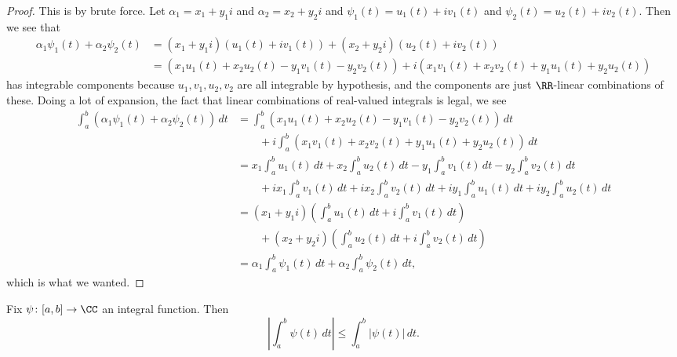 \begin{proof}
	This is by brute force. Let $\alpha_1=x_1+y_1i$ and $\alpha_2=x_2+y_2i$ and $\psi_1(t)=u_1(t)+iv_1(t)$ and $\psi_2(t)=u_2(t)+iv_2(t)$. Then we see that
	\begin{align*}
		\alpha_1\psi_1(t)+\alpha_2\psi_2(t) &= (x_1+y_1i)(u_1(t)+iv_1(t))+(x_2
		+y_2i)(u_2(t)+iv_2(t)) \\
		&= (x_1u_1(t)+x_2u_2(t)-y_1v_1(t)-y_2v_2(t))+i(x_1v_1(t)+x_2v_2(t)+y_1u_1(t)+y_2u_2(t))
	\end{align*}
	has integrable components because $u_1,v_1,u_2,v_2$ are all integrable by hypothesis, and the components are just $\RR$-linear combinations of these. Doing a lot of expansion, the fact that linear combinations of real-valued integrals is legal, we see
	\begin{align*}
		\int_a^b(\alpha_1\psi_1(t)+\alpha_2\psi_2(t))\,dt &= \int_a^b(x_1u_1(t)+x_2u_2(t)-y_1v_1(t)-y_2v_2(t))\,dt \\
		&\qquad+i\int_a^b(x_1v_1(t)+x_2v_2(t)+y_1u_1(t)+y_2u_2(t))\,dt \\
		&= x_1\int_a^bu_1(t)\,dt+x_2\int_a^bu_2(t)\,dt-y_1\int_a^bv_1(t)\,dt-y_2\int_a^bv_2(t)\,dt \\
		&\qquad+ix_1\int_a^bv_1(t)\,dt+ix_2\int_a^bv_2(t)\,dt+iy_1\int_a^bu_1(t)\,dt+iy_2\int_a^bu_2(t)\,dt \\
		&= (x_1+y_1i)\left(\int_a^bu_1(t)\,dt+i\int_a^bv_1(t)\,dt\right)\\
		&\qquad+(x_2+y_2i)\left(\int_a^bu_2(t)\,dt+i\int_a^bv_2(t)\,dt\right) \\
		&= \alpha_1\int_a^b\psi_1(t)\,dt+\alpha_2\int_a^b\psi_2(t)\,dt,
	\end{align*}
	which is what we wanted.
\end{proof}
\begin{lemma}
	Fix $\psi\colon [a,b]\to\CC$ an integral function. Then
	\[\left|\int_a^b\psi(t)\,dt\right|\le\int_a^b|\psi(t)|\,dt.\]
\end{lemma}

